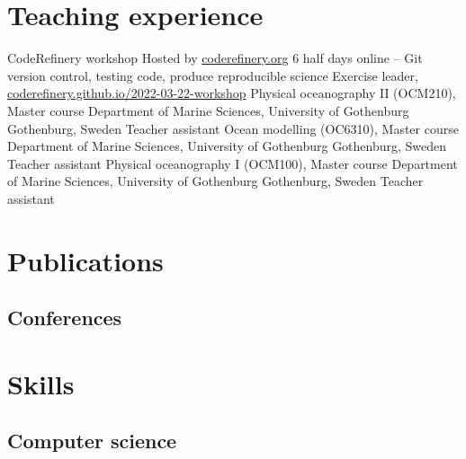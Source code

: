 \documentclass[11pt,a4paper,roman]{moderncv}
\begin{document}
\section{Teaching experience}
        {CodeRefinery workshop}
        {Hosted by \href{https://coderefinery.org}{coderefinery.org}}
        {6 half days online -- Git version control, testing code, produce reproducible science}
        {Exercise leader, \href{https://coderefinery.github.io/2022-03-22-workshop}{coderefinery.github.io/2022-03-22-workshop}}
        {}
        {Physical oceanography II (OCM210), Master course}
        {Department of Marine Sciences, University of Gothenburg}
        {Gothenburg, Sweden}
        {Teacher assistant}
        {}
        {Ocean modelling (OC6310), Master course}
        {Department of Marine Sciences, University of Gothenburg}
        {Gothenburg, Sweden}
        {Teacher assistant}
        {}
        {Physical oceanography I (OCM100), Master course}
        {Department of Marine Sciences, University of Gothenburg}
        {Gothenburg, Sweden}
        {Teacher assistant}
        {}

\section{Publications}
\nocite{*}



\subsection{Conferences}
        
\section{Skills}


\subsection{Computer science}
\end{document}
